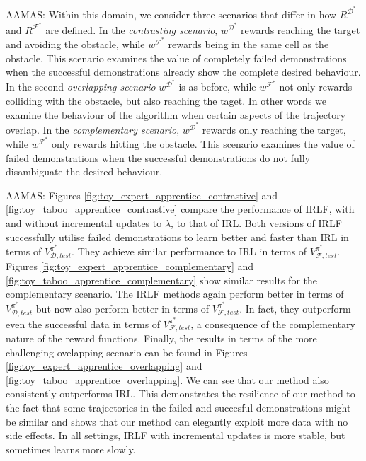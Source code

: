 \documentclass{aamas2016}
\newcommand{\jm}[1]{\textcolor{blue}{Joao: #1}}
\newcommand{\ks}[1]{\textcolor{dark_green}{Kyriacos: #1}}
\newcommand{\aama}[1]{\textcolor{dim_gray}{AAMAS: #1}}
\newcommand{\jm}[1]{}
\newcommand{\ks}[1]{}
\begin{document}

\aama{Within this domain, we consider three scenarios that differ in how $R^{\mathcal{D}^*}$ and $R^{\mathcal{F}^*}$ are defined.  In the \emph{contrasting scenario}, $w^{\mathcal{D}^*}$ rewards reaching the target and avoiding the obstacle, while $w^{\mathcal{F}^*}$ rewards being in the same cell as the obstacle.  This scenario examines the value of completely failed demonstrations when the successful demonstrations already show the complete desired behaviour. In the second \emph{overlapping scenario} $w^{\mathcal{D}^*}$ is as before, while $w^{\mathcal{F}^*}$ not only rewards colliding with the obstacle, but also reaching the taget. In other words we examine the behaviour of the algorithm when certain aspects of the trajectory overlap. In the \emph{complementary scenario}, $w^{\mathcal{D}^*}$ rewards only reaching the target, while $w^{\mathcal{F}^*}$ only rewards hitting the obstacle. This scenario examines the value of failed demonstrations when the successful demonstrations do not fully disambiguate the desired behaviour.}


\aama{Figures \ref{fig:toy_expert_apprentice_contrastive} and \ref{fig:toy_taboo_apprentice_contrastive} compare the performance of IRLF, with and without incremental updates to $\lambda$, to that of IRL. Both versions of IRLF successfully utilise failed demonstrations to learn better and faster than IRL in terms of $V^{\pi^*}_{\mathcal{D},test}$.  They achieve similar performance to IRL in terms of $V^{\pi^*}_{\mathcal{F},test}$.  Figures \ref{fig:toy_expert_apprentice_complementary} and \ref{fig:toy_taboo_apprentice_complementary} show similar results for the complementary scenario.  The IRLF methods again perform better in terms of $V^{\pi^*}_{\mathcal{D},test}$ but now also perform better in terms of $V^{\pi^*}_{\mathcal{F},test}$.  In fact, they outperform even the successful data in terms of $V^{\pi^*}_{\mathcal{F},test}$, a consequence of the complementary nature of the reward functions. Finally, the results in terms of the more challenging ovelapping scenario can be found in Figures \ref{fig:toy_expert_apprentice_overlapping} and \ref{fig:toy_taboo_apprentice_overlapping}. We can see that our method also consistently outperforms IRL. This demonstrates the resilience of our method to the fact that some trajectories in the failed and succesful demonstrations might be similar and shows that our method can elegantly exploit more data with no side effects. In all settings, IRLF with incremental updates is more stable, but sometimes learns more slowly.}
\end{document}
